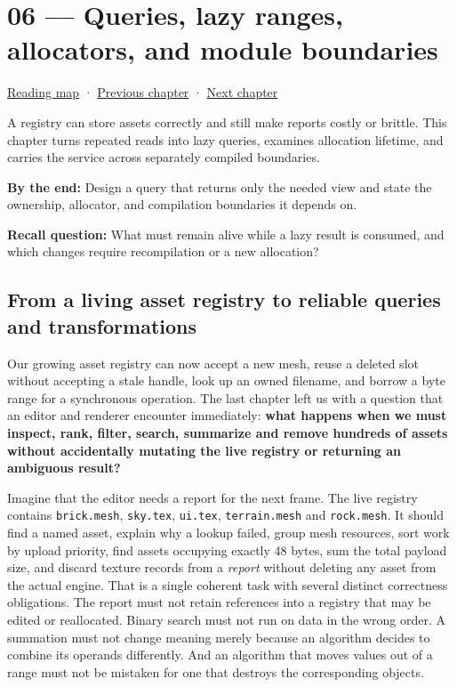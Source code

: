 \hypertarget{05-engine-i-ch006}{}
\chapter{06 --- Queries, lazy ranges, allocators, and module boundaries}\label{05-engine-i-ch006-queries-lazy-ranges-allocators-and-module-boundaries}

\hyperref[volume-reading-map]{Reading map} · \hyperref[05-engine-i-ch005-generic-asset-pipelines-with-stable-identity]{Previous chapter} · \hyperref[05-engine-i-ch007-typed-apis-and-measured-cpu-data-structures]{Next chapter}

A registry can store assets correctly and still make reports costly or brittle. This chapter turns repeated reads into lazy queries, examines allocation lifetime, and carries the service across separately compiled boundaries.

\textbf{By the end:} Design a query that returns only the needed view and state the ownership, allocator, and compilation boundaries it depends on.

\textbf{Recall question:} What must remain alive while a lazy result is consumed, and which changes require recompilation or a new allocation?

\section{From a living asset registry to reliable queries and transformations}\label{05-engine-i-ch006-from-a-living-asset-registry-to-reliable-queries-and-transformations}

Our growing asset registry can now accept a new mesh, reuse a deleted slot without accepting a stale handle, look up an owned filename, and borrow a byte range for a synchronous operation. The last chapter left us with a question that an editor and renderer encounter immediately: \textbf{what happens when we must inspect, rank, filter, search, summarize and remove hundreds of assets without accidentally mutating the live registry or returning an ambiguous result?}

Imagine that the editor needs a report for the next frame. The live registry contains \texttt{brick.mesh}, \texttt{sky.tex}, \texttt{ui.tex}, \texttt{terrain.mesh} and \texttt{rock.mesh}. It should find a named asset, explain why a lookup failed, group mesh resources, sort work by upload priority, find assets occupying exactly 48 bytes, sum the total payload size, and discard texture records from a \emph{report} without deleting any asset from the actual engine. That is a single coherent task with several distinct correctness obligations. The report must not retain references into a registry that may be edited or reallocated. Binary search must not run on data in the wrong order. A summation must not change meaning merely because an algorithm decides to combine its operands differently. And an algorithm that moves values out of a range must not be mistaken for one that destroys the corresponding objects.


